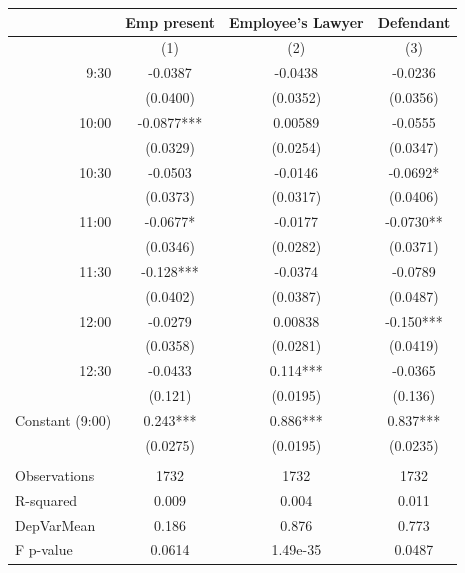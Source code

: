 \begin{tabular}{lccc}
\toprule
      & Emp present & Employee's Lawyer & Defendant \\
\midrule
      & (1)   & (2)   & (3) \\
\midrule
\midrule
\multicolumn{1}{r}{9:30} & -0.0387 & -0.0438 & -0.0236 \\
      & (0.0400) & (0.0352) & (0.0356) \\
\multicolumn{1}{r}{10:00} & -0.0877*** & 0.00589 & -0.0555 \\
      & (0.0329) & (0.0254) & (0.0347) \\
\multicolumn{1}{r}{10:30} & -0.0503 & -0.0146 & -0.0692* \\
      & (0.0373) & (0.0317) & (0.0406) \\
\multicolumn{1}{r}{11:00} & -0.0677* & -0.0177 & -0.0730** \\
      & (0.0346) & (0.0282) & (0.0371) \\
\multicolumn{1}{r}{11:30} & -0.128*** & -0.0374 & -0.0789 \\
      & (0.0402) & (0.0387) & (0.0487) \\
\multicolumn{1}{r}{12:00} & -0.0279 & 0.00838 & -0.150*** \\
      & (0.0358) & (0.0281) & (0.0419) \\
\multicolumn{1}{r}{12:30} & -0.0433 & 0.114*** & -0.0365 \\
      & (0.121) & (0.0195) & (0.136) \\
Constant (9:00) & 0.243*** & 0.886*** & 0.837*** \\
      & (0.0275) & (0.0195) & (0.0235) \\
      &       &       &  \\
\midrule
Observations & 1732  & 1732  & 1732 \\
R-squared & 0.009 & 0.004 & 0.011 \\
DepVarMean & 0.186 & 0.876 & 0.773 \\
F p-value & 0.0614 & 1.49e-35 & 0.0487 \\
\bottomrule
\bottomrule
\end{tabular}%
